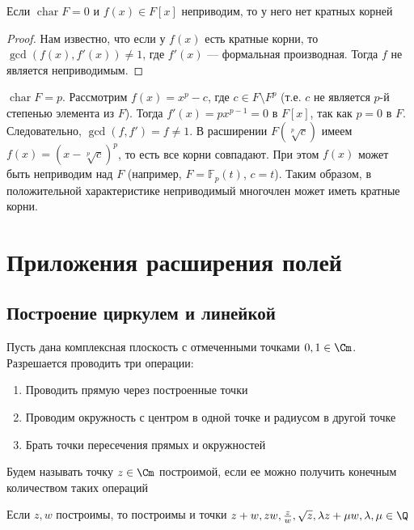 \begin{proposition}
    Если \(\operatorname{char} F = 0\) и \(f(x) \in F[x]\) неприводим, то у него нет кратных корней
\end{proposition}
\begin{proof}
    Нам известно, что если у \(f(x)\) есть кратные корни, то \(\gcd(f(x), f'(x)) \ne 1\), где \(f'(x)\) --- формальная производная. Тогда \(f\) не является неприводимым.
\end{proof}

\begin{example}
    \(\operatorname{char} F = p\). Рассмотрим \(f(x) = x^p - c\), где \(c \in F \setminus F^p\) (т.е. \(c\) не является \(p\)-й степенью элемента из \(F\)). Тогда \(f'(x) = p x^{p-1} = 0\) в \(F[x]\), так как \(p = 0\) в \(F\). Следовательно, \(\gcd(f, f') = f \ne 1\). В расширении \(F(\sqrt[p]{c})\) имеем \(f(x) = (x - \sqrt[p]{c})^p\), то есть все корни совпадают. При этом \(f(x)\) может быть неприводим над \(F\) (например, \(F = \mathbb{F}_p(t)\), \(c = t\)). Таким образом, в положительной характеристике неприводимый многочлен может иметь кратные корни.
\end{example}

\section{Приложения расширения полей}
\subsection{Построение циркулем и линейкой}
Пусть дана комплексная плоскость с отмеченными точками \(0, 1 \in \Cm\). Разрешается проводить три операции:
\begin{enumerate}
    \item Проводить прямую через построенные точки
    \item Проводим окружность с центром в одной точке и радиусом в другой точке
    \item Брать точки пересечения прямых и окружностей
\end{enumerate}

\begin{definition}
    Будем называть точку \(z \in \Cm\) построимой, если ее можно получить конечным количеством таких операций
\end{definition}

\begin{problem}
    Если \(z, w\) построимы, то построимы и точки \(z + w, zw, \frac{z}{w}, \sqrt{z}, \lambda z + \mu w, \lambda, \mu \in \Q\)
\end{problem}

